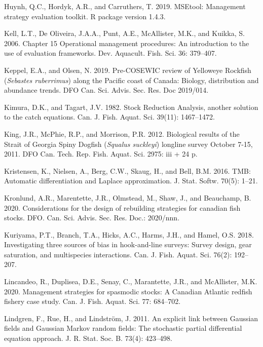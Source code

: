 \documentclass[11pt]{book}
\begin{document}
\leavevmode\hypertarget{ref-huynh_msetool_2019}{}%
Huynh, Q.C., Hordyk, A.R., and Carruthers, T. 2019. MSEtool: Management strategy evaluation toolkit. R package version 1.4.3.

\leavevmode\hypertarget{ref-kell2006}{}%
Kell, L.T., De Oliveira, J.A.A., Punt, A.E., McAllister, M.K., and Kuikka, S. 2006. Chapter 15 Operational management procedures: An introduction to the use of evaluation frameworks. Dev. Aquacult. Fish. Sci. 36: 379--407.

\leavevmode\hypertarget{ref-keppel2019}{}%
Keppel, E.A., and Olsen, N. 2019. Pre-COSEWIC review of Yelloweye Rockfish (\emph{Sebastes ruberrimus}) along the Pacific coast of Canada: Biology, distribution and abundance trends. DFO Can. Sci. Advis. Sec. Res. Doc 2019/014.

\leavevmode\hypertarget{ref-kimura1982}{}%
Kimura, D.K., and Tagart, J.V. 1982. Stock Reduction Analysis, another solution to the catch equations. Can. J. Fish. Aquat. Sci. 39(11): 1467--1472.

\leavevmode\hypertarget{ref-king2012}{}%
King, J.R., McPhie, R.P., and Morrison, P.R. 2012. Biological results of the Strait of Georgia Spiny Dogfish (\emph{Squalus suckleyi}) longline survey October 7-15, 2011. DFO Can. Tech. Rep. Fish. Aquat. Sci. 2975: iii + 24 p.

\leavevmode\hypertarget{ref-tmb}{}%
Kristensen, K., Nielsen, A., Berg, C.W., Skaug, H., and Bell, B.M. 2016. TMB: Automatic differentiation and Laplace approximation. J. Stat. Softw. 70(5): 1--21.

\leavevmode\hypertarget{ref-kronlund2020}{}%
Kronlund, A.R., Marentette, J.R., Olmstead, M., Shaw, J., and Beauchamp, B. 2020. Considerations for the design of rebuilding strategies for canadian fish stocks. DFO. Can. Sci. Advis. Sec. Res. Doc.: 2020/nnn.

\leavevmode\hypertarget{ref-kuriyama2018}{}%
Kuriyama, P.T., Branch, T.A., Hicks, A.C., Harms, J.H., and Hamel, O.S. 2018. Investigating three sources of bias in hook-and-line surveys: Survey design, gear saturation, and multispecies interactions. Can. J. Fish. Aquat. Sci. 76(2): 192--207.

\leavevmode\hypertarget{ref-lincandeo2020}{}%
Lincandeo, R., Duplisea, D.E., Senay, C., Marantette, J.R., and McAllister, M.K. 2020. Management strategies for spasmodic stocks: A Canadian Atlantic redfish fishery case study. Can. J. Fish. Aquat. Sci. 77: 684--702.

\leavevmode\hypertarget{ref-lindgren2011}{}%
Lindgren, F., Rue, H., and Lindström, J. 2011. An explicit link between Gaussian fields and Gaussian Markov random fields: The stochastic partial differential equation approach. J. R. Stat. Soc. B. 73(4): 423--498.
\end{document}
